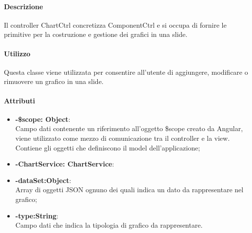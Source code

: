 \paragraph{Descrizione}
Il controller ChartCtrl concretizza ComponentCtrl e si occupa di fornire le primitive per la costruzione e gestione dei grafici in una slide.

\paragraph{Utilizzo}
Questa classe viene utilizzata per consentire all'utente di aggiungere, modificare o rimuovere un grafico in una slide.

\paragraph{Attributi}
\begin{itemize}
	\item \textbf{-\$scope: Object}:\\
	Campo dati contenente un riferimento all'oggetto \$scope creato da Angular, viene utilizzato come mezzo di comunicazione tra il controller e la view. Contiene gli oggetti che definiscono il model dell'applicazione;
	\item \textbf{-ChartService: ChartService}:\\
	\item\textbf{-dataSet:Object}:\\
	Array di oggetti JSON ognuno dei quali indica un dato da rappresentare nel grafico;
	\item\textbf{-type:String}:\\
	Campo dati che indica la tipologia di grafico da rappresentare.
\end{itemize}

